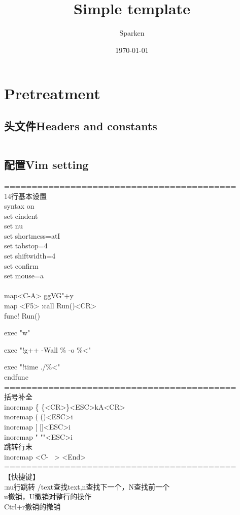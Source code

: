 \documentclass[twoside,sub3section,UTF8]{ctexart}						%
\title{Simple template}									%
\author{Sparken}										%
\date{\today}											%
\begin{document}
\maketitle

\newpage
\tableofcontents 														%

\newpage 																%
\section{Pretreatment}												%
	\subsection{头文件Headers and constants}
	\inputminted[breaklines]{c++}{"Other/headers.cpp"}
	\newpage
	\subsection{配置Vim setting}
		\noindent==========================================\\
		14行基本设置\\
		syntax on\\
		set cindent\\
		set nu		\\
		set shortmess=atI	\\
		set tabstop=4\\
		set shiftwidth=4\\
		set confirm\\
		set mouse=a\\
\\
		map<C-A> ggVG"+y\\
		map <F5> :call Run()<CR>\\
		func! Run()\par
			exec "w"\par
			exec "!g++ -Wall \% -o \%<"\par
			exec "!time ./\%<"\\
		endfunc\\
		==========================================\\
		括号补全\\
		inoremap \{ \{<CR>\}<ESC>kA<CR>\\
		inoremap ( ()<ESC>i\\
		inoremap [ []<ESC>i\\
		inoremap " ""<ESC>i\\
		跳转行末\\
		inoremap <C- \ > <End>\\
		==========================================\\
		【快捷键】\\
		:nu行跳转
		/text查找text,n查找下一个，N查找前一个\\
		u撤销，U撤销对整行的操作\\
		Ctrl+r撤销的撤销\\
\end{document}
